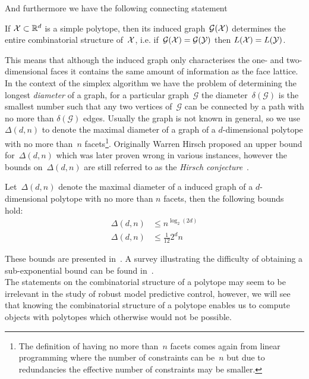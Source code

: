 %
And furthermore we have the following connecting statement
%
\begin{thm}
If $\mathcal X\subset\mathbb R^d$ is a simple polytope, then its induced graph~$\mathcal G(\mathcal X)$ determines the entire combinatorial structure of~$\mathcal X$, i.e. if~$\mathcal G(\mathcal X)=\mathcal G(\mathcal Y)$ then $L(\mathcal X)=L(\mathcal Y)$.
\end{thm}
%
\noindent This means that although the induced graph only characterises the one- and two-dimensional faces it contains the same amount of information as the face lattice.
%
In the context of the simplex algorithm we have the problem of determining the longest \emph{diameter} of a graph, for a particular graph~$\mathcal G$ the diameter~$\delta(\mathcal G)$ is the smallest number such that any two vertices of~$\mathcal G$ can be connected by a path with no more than $\delta(\mathcal G)$ edges.
%
Usually the graph is not known in general, so we use~$\Delta(d,n)$ to denote the maximal diameter of a graph of a $d$-dimensional polytope with no more than~$n$ facets\footnote{The definition of having no more than~$n$ facets comes again from linear programming where the number of constraints can be~$n$ but due to redundancies the effective number of constraints may be smaller.}.
%
Originally Warren Hirsch proposed an upper bound for~$\Delta(d,n)$ which was later proven wrong in various instances, however the bounds on~$\Delta(d,n)$ are still referred to as the \emph{Hirsch conjecture}~\cite{Ziegler:2012}.
%
\begin{thm}
Let~$\Delta(d,n)$ denote the maximal diameter of a induced graph of a $d$-dimensional polytope with no more than $n$ facets, then the following bounds hold:
%
\begin{equation}
	\begin{aligned}
	\Delta(d,n) &\leq n^{\log_2(2d)}\\
	\Delta(d,n) &\leq \frac{1}{12}2^dn
	\end{aligned}
\end{equation}
\end{thm}
%
\noindent These bounds are presented in~\cite{Ziegler:2012,Ziegler:1995,Kalai:1992,Barnette:1974}.
%
A survey illustrating the difficulty of obtaining a sub-exponential bound can be found in~\cite{Klee:1987}.
%
\\[1em]
%
The statements on the combinatorial structure of a polytope may seem to be irrelevant in the study of robust model predictive control, however, we will see that knowing the combinatorial structure of a polytope enables us to compute objects with polytopes which otherwise would not be possible.
